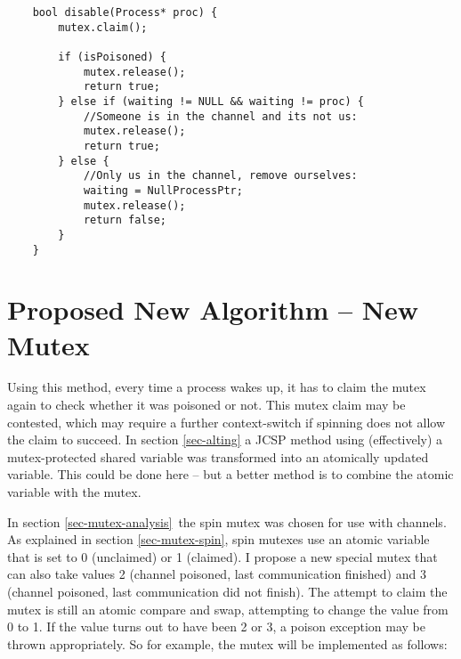 \documentclass{article}
\begin{document}
{\begin{verbatim}
    bool disable(Process* proc) {
        mutex.claim();

        if (isPoisoned) {
            mutex.release();
            return true;
        } else if (waiting != NULL && waiting != proc) {
            //Someone is in the channel and its not us:
            mutex.release();
            return true;
        } else {
            //Only us in the channel, remove ourselves:
            waiting = NullProcessPtr;
            mutex.release();
            return false;
        }
    }
\end{verbatim}}



\section{Proposed New Algorithm -- New Mutex}

Using this method, every time a process wakes up, it has to claim the mutex again to check whether it was poisoned or not.  This mutex claim may be 
contested, which may require a further context-switch if spinning does not allow the claim to succeed.  In section \ref{sec-alting} a JCSP method 
using (effectively) a mutex-protected shared variable was transformed into an atomically updated variable.  This could be done here -- but a better 
method is to combine the atomic variable with the mutex.

In section \ref{sec-mutex-analysis}~the spin mutex was chosen for use with channels.  As explained in section \ref{sec-mutex-spin}, spin mutexes use 
an atomic variable that is set to 0 (unclaimed) or 1 (claimed).  I propose a new special mutex that can also take values 2 (channel poisoned, last 
communication finished) and 3 (channel poisoned, last communication did not finish).  The attempt to claim the mutex is still an atomic compare and 
swap, attempting to change the value from 0 to 1.  If the value turns out to have been 2 or 3, a poison exception may be thrown appropriately.  So for 
example, the mutex will be implemented as follows:
\end{document}
